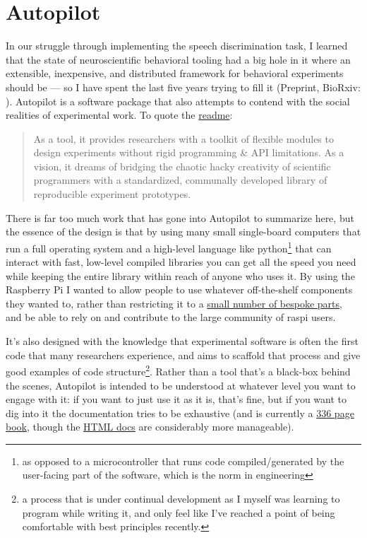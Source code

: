 \section{Autopilot}
\label{sec:autopilot}

In our struggle through implementing the speech discrimination task, I learned that the state of neuroscientific behavioral tooling had a big hole in it where an extensible, inexpensive, and distributed framework for behavioral experiments should be --- so I have spent the last five years trying to fill it (Preprint, BioRxiv: \cite{saundersAutopilotAutomatingBehavioral2019}). Autopilot is a software package that also attempts to contend with the social realities of experimental work. To quote the \href{https://github.com/wehr-lab/autopilot/blob/main/README.md}{readme}:

\begin{quote}
As a tool, it provides researchers with a toolkit of flexible modules to design experiments without rigid programming \& API limitations. As a vision, it dreams of bridging the chaotic hacky creativity of scientific programmers with a standardized, communally developed library of reproducible experiment prototypes.
\end{quote}


There is far too much work that has gone into Autopilot to summarize here, but the essence of the design is that by using many small single-board computers that run a full operating system and a high-level language like python\footnote{as opposed to a microcontroller that runs code compiled/generated by the user-facing part of the software, which is the norm in engineering} that can interact with fast, low-level compiled libraries you can get all the speed you need while keeping the entire library within reach of anyone who uses it. By using the Raspberry Pi I wanted to allow people to use whatever off-the-shelf components they wanted to, rather than restricting it to a \href{https://sanworks.io/shop/products.php?productFamily=bpod}{small number of bespoke parts}, and be able to rely on and contribute to the large community of raspi users.

It's also designed with the knowledge that experimental software is often the first code that many researchers experience, and aims to scaffold that process and give good examples of code structure\footnote{a process that is under continual development as I myself was learning to program while writing it, and only feel like I've reached a point of being comfortable with best principles recently.}. Rather than a tool that's a black-box behind the scenes, Autopilot is intended to be understood at whatever level you want to engage with it: if you want to just use it as it is, that's fine, but if you want to dig into it the documentation tries to be exhaustive (and is currently a \href{https://docs.auto-pi-lot.com/_/downloads/en/latest/pdf/}{336 page book}, though the \href{https://docs.auto-pi-lot.com/en/latest/}{HTML docs} are considerably more manageable).

